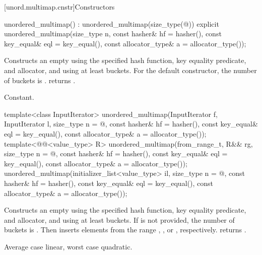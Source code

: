 [unord.multimap.cnstr]{Constructors}

%
\begin{itemdecl}
unordered_multimap() : unordered_multimap(size_type(@\seebelow@)) { }
explicit unordered_multimap(size_type n,
                            const hasher& hf = hasher(),
                            const key_equal& eql = key_equal(),
                            const allocator_type& a = allocator_type());
\end{itemdecl}

\begin{itemdescr}
\pnum
\effects
Constructs an empty  using the
specified hash function, key equality predicate, and allocator, and
using at least  buckets.  For the default constructor,
the number of buckets is .
 returns .

\pnum
\complexity
Constant.
\end{itemdescr}

%
\begin{itemdecl}
template<class InputIterator>
  unordered_multimap(InputIterator f, InputIterator l,
                     size_type n = @\seebelow@,
                     const hasher& hf = hasher(),
                     const key_equal& eql = key_equal(),
                     const allocator_type& a = allocator_type());
template<@@<value_type> R>
  unordered_multimap(from_range_t, R&& rg,
                     size_type n = @\seebelow@,
                     const hasher& hf = hasher(),
                     const key_equal& eql = key_equal(),
                     const allocator_type& a = allocator_type());
unordered_multimap(initializer_list<value_type> il,
                   size_type n = @\seebelow@,
                   const hasher& hf = hasher(),
                   const key_equal& eql = key_equal(),
                   const allocator_type& a = allocator_type());
\end{itemdecl}

\begin{itemdescr}
\pnum
\effects
Constructs an empty  using the
specified hash function, key equality predicate, and allocator, and
using at least  buckets. If  is not
provided, the number of buckets is . Then
inserts elements from the range , , or ,
respectively.
 returns .

\pnum
\complexity
Average case linear, worst case quadratic.
\end{itemdescr}

